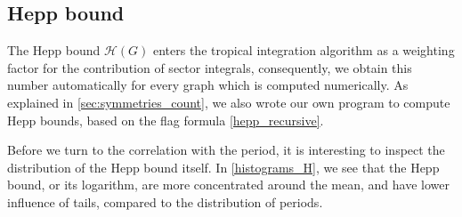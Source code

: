 \documentclass[11pt,a4paper]{article}
\renewcommand{\|}{\rule[-0.4ex]{0.2ex}{1.2em}}
\begin{document}
\FloatBarrier


\subsection{Hepp bound}\label{sec:hepp}

The Hepp bound $\mathcal H(G)$ enters the tropical integration algorithm \cite{borinsky_tropical_2023a} as a weighting factor for the contribution of sector integrals, consequently, we obtain this number automatically for every graph which is computed numerically. As explained in \cref{sec:symmetries_count}, we also wrote our own program to compute Hepp bounds, based on the flag formula \cref{hepp_recursive}.

Before we turn to the correlation with the period, it is interesting to inspect the distribution of the Hepp bound itself. In \cref{histograms_H}, we see that the Hepp bound, or its logarithm, are more concentrated around the mean, and have lower influence of tails, compared to the distribution of periods.
\end{document}
